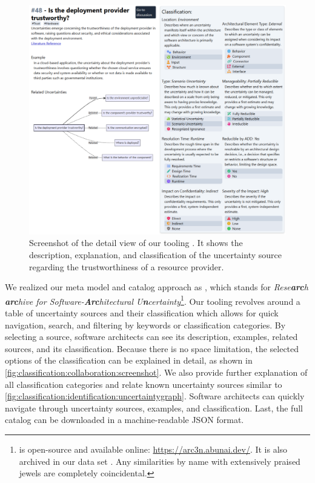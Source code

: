\begin{figure}
    \centering
    \includegraphics[width=\linewidth]{figures/chapter5/arc3n-screenshot.pdf}
    \caption[Screenshot of the detail view of our tooling.]{Screenshot of the detail view of our tooling \arcen. It shows the description, explanation, and classification of the uncertainty source regarding the trustworthiness of a resource provider.}
    \label{fig:classification:collaboration:screenshot}
\end{figure}

We realized our meta model and catalog approach as \textbf{\arcen}, which stands for \emph{Rese\textbf{arc}h \textbf{arc}hive for Software-\textbf{Arc}hitectural U\textbf{n}certainty}\footnote{\arcen is open-source and available online: \url{https://arc3n.abunai.dev/}. It is also archived in our data set \cite{dataset}. Any similarities by name with extensively praised jewels are completely coincidental.}.
Our tooling revolves around a table of uncertainty sources and their classification which allows for quick navigation, search, and filtering by keywords or classification categories.
By selecting a source, software architects can see its description, examples, related sources, and its classification.
Because there is no space limitation, the selected options of the classification can be explained in detail, as shown in \autoref{fig:classification:collaboration:screenshot}.
We also provide further explanation of all classification categories and relate known uncertainty sources similar to \autoref{fig:classification:identification:uncertaintygraph}.
Software architects can quickly navigate through uncertainty sources, examples, and classification.
Last, the full catalog can be downloaded in a machine-readable \ac{JSON} format.

